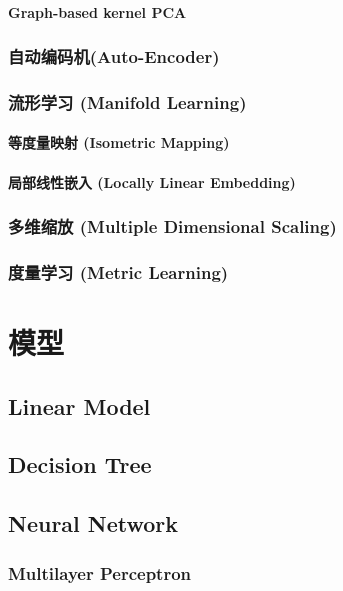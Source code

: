 \documentclass[oneside]{book}
\begin{document}
					\subsubsection{Graph-based kernel PCA \NovaMonoFont{[Nonlinear]}}
					
				
				\subsection{自动编码机(Auto-Encoder)}
				\subsection{流形学习 (Manifold Learning) }
					\subsubsection{等度量映射 (Isometric Mapping)  \NovaMonoFont{[Nonlinear]}}
					\subsubsection{局部线性嵌入 (Locally Linear Embedding)  \NovaMonoFont{[Linear]}}
			\subsection{多维缩放 (Multiple Dimensional Scaling)}
			\subsection{度量学习 (Metric Learning)}
			
			
		
	\chapter{模型}
		\section{Linear Model}
		\section{Decision Tree}
		\section{Neural Network}
			\subsection{Multilayer Perceptron}
\end{document}
